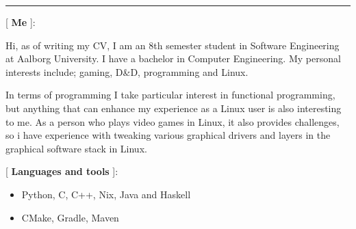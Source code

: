 \documentclass[a4paper, 14pt]{article}
\title{}
\date{}
\newcommand{\cvsection}[2]{
    \begin{minipage}[t]{.25\textwidth}
        [ \textbf{#1} ]:
    \end{minipage}
    \vrule
    \hspace{2mm}
    \begin{minipage}[t]{.70\textwidth}
        #2
    \end{minipage}
    \vspace{.25cm}
}
\begin{document}
    \begin{minipage}{.75\textwidth}
    \maketitle
    \end{minipage}
    \begin{minipage}{.25\textwidth}
    \end{minipage}
    \hrule
    \vspace{.5cm}


    \cvsection{Me}{
        Hi, as of writing my CV, I am an 8th semester student in Software Engineering at Aalborg University. 
        I have a bachelor in Computer Engineering. 
        My personal interests include; gaming, D\&D, programming and Linux.

        In terms of programming I take particular interest in functional programming, but anything that can enhance my experience as a Linux user is also interesting to me.
        As a person who plays video games in Linux, it also provides challenges, so i have experience with tweaking various graphical drivers and layers in the graphical software stack in Linux.
    }

    \cvsection{Languages and tools}{
        \begin{itemize}
            \item Python, C, C++, Nix, Java and Haskell
            \item CMake, Gradle, Maven
        \end{itemize}
    }
\end{document}
